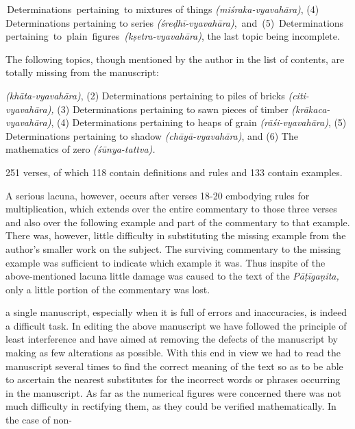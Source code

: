 \documentclass[10pt, openany]{book}
\begin{document}
\vspace{0.3cm} {
\,{Determinations \,pertaining \,to mixtures of things {\textit{(miśraka-vyavahāra)}},}
{(4) Determinations pertaining to series {\textit{(śreḍhī-vyavahāra)}}, \,and}
\,{(5) \,Determinations \,pertaining \,to \,plain \,figures \,{\textit{(kṣetra-vyavahāra)}},}
{the last topic being incomplete.}}



\newpage


{The following topics, though mentioned by the author}
{in the list of contents, are totally missing from the manuscript:}

\vspace{0.3cm} \textit{(khāta-vyavahāra)}, {(2) Determinations pertaining to piles of bricks}
\textit{(citi-vyavahāra), }(3) {Determinations pertaining to sawn pieces}
{of timber} \textit{(krākaca-vyavahāra)}, {(4) Determinations pertaining}
{to heaps of grain \textit{(rāśi-vyavahāra)}, (5) Determinations pertaining}
{to shadow \textit{(chāyā-vyavahāra)}, and (6) The mathematics of}
{zero \textit{(śūnya-tattva).}}

{251 verses, of which 118 contain definitions and rules and}
{133 contain examples.}

\vspace{0.3cm}{The manuscript is fairly complete in so far as it goes.}
{A serious lacuna, however, occurs after verses {18-20}  embodying}
{rules for multiplication, which extends over the entire}
{commentary to those three verses and also over the following example}
{and part of the commentary to that example. There was,}
{however, little difficulty in substituting the missing example}
{from the author's smaller work on the subject. The surviving}
{commentary to the missing example was sufficient to indicate}
{which example it was. Thus inspite of the above-mentioned}
{lacuna little damage was caused to the text of the \textit{Pāṭīgaṇita,}}
{only a little portion of the commentary was lost.}

\vspace{0.3cm}{The editing of an ancient Sanskrit work on the basis of}
{a single manuscript, especially when it is full of errors and}
{inaccuracies, is indeed a difficult task. In editing the above}
{manuscript we have followed the principle of least interference}
{and have aimed at removing the defects of the manuscript}
{by making as few alterations as possible. With this end in}
{view we had to read the manuscript several times to find the}
{correct meaning of the text so as to be able to ascertain the}
{nearest substitutes for the incorrect words or phrases occurring}
{in the manuscript. As far as the numerical figures were }
{concerned there was not much difficulty in rectifying them, as}
{they could be verified mathematically. In the case of non-}
\end{document}

